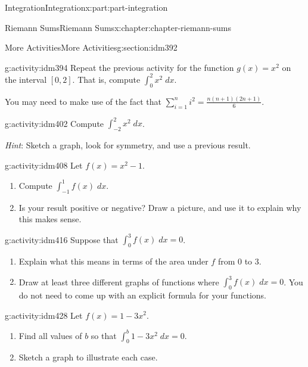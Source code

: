 \documentclass[oneside,10pt,]{book}
\numberwithin{equation}{section}
\begin{document}
\begin{partptx}{Integration}{}{Integration}{}{}{x:part:part-integration}
\begin{chapterptx}{Riemann Sums}{}{Riemann Sums}{}{}{x:chapter:chapter-riemann-sums}
%
\begin{sectionptx}{More Activities}{}{More Activities}{}{}{g:section:idm392}
\begin{activity}{}{g:activity:idm394}%
Repeat the previous activity for the function \(g(x) = x^2\) on the interval \([0,2]\). That is, compute \(\displaystyle \int_0^2 x^2 \; dx\).%
\par
You may need to make use of the fact that \(\displaystyle\sum_{i=1}^n i^2 = \frac{n(n+1)(2n+1)}{6}\).%
\end{activity}
\begin{activity}{}{g:activity:idm402}%
Compute \(\displaystyle\int_{-2}^2 x^2 \;dx\).%
\par
\emph{Hint}: Sketch a graph, look for symmetry, and use a previous result.%
\end{activity}
\begin{activity}{}{g:activity:idm408}%
Let \(f(x) = x^2 -1 \).%
\begin{enumerate}[font=\bfseries,label=(\alph*),ref=\alph*]
\item{}Compute \(\displaystyle \int_{-1}^1 f(x)\; dx\).\item{}Is your result positive or negative? Draw a picture, and use it to explain why this makes sense.%
\end{enumerate}
\end{activity}
\begin{activity}{}{g:activity:idm416}%
Suppose that \(\displaystyle \int_0^3 f(x)\;dx = 0\).%
\begin{enumerate}[font=\bfseries,label=(\alph*),ref=\alph*]
\item{}Explain what this means in terms of the area under \(f\) from \(0\) to \(3\).%
\item{}Draw at least three different graphs of functions where \(\displaystyle \int_0^3 f(x)\;dx = 0\). You do not need to come up with an explicit formula for your functions.%
\end{enumerate}
\end{activity}
\begin{activity}{}{g:activity:idm428}%
Let \(f(x) = 1-3x^2\).%
\begin{enumerate}[font=\bfseries,label=(\alph*),ref=\alph*]
\item{}Find all values of \(b\) so that \(\displaystyle\int_0^b 1-3x^2\; dx = 0\).%
\item{}Sketch a graph to illustrate each case.%
\end{enumerate}
\end{activity}

\end{sectionptx}
\end{chapterptx}
\end{partptx}
\end{document}
